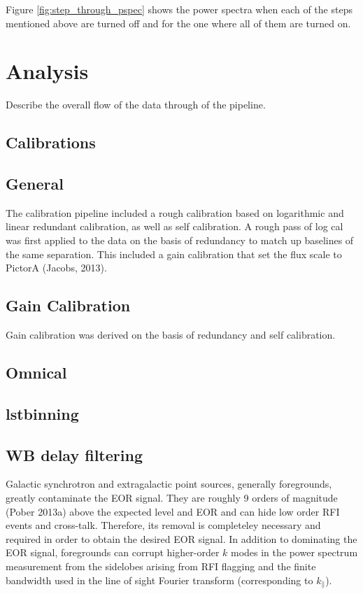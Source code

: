 \documentclass[twocolumn,numberedappendix]{emulateapj}
\begin{document}
Figure \ref{fig:step_through_pspec} shows the power spectra when each of the
steps mentioned above are turned off and for the one where all of them are
turned on.




\section{Analysis}
Describe the overall flow of the data through of the pipeline.
\subsection{Calibrations}
\subsection{General}
The calibration pipeline included a rough calibration based on logarithmic and
linear redundant calibration, as well as self calibration. A rough pass of log
cal was first applied to the data on the basis of redundancy to match up
baselines of the same separation. This included a gain calibration that set the
flux scale to PictorA (Jacobs, 2013).

\subsection{Gain Calibration}
Gain calibration was derived on the basis of redundancy and self calibration.

\subsection{Omnical}
%

\subsection{lstbinning}

\subsection{WB delay filtering}
Galactic synchrotron and extragalactic point sources, generally foregrounds,
greatly contaminate the EOR signal. They are roughly 9 orders of magnitude
(Pober 2013a) above the expected level and EOR and can hide low order RFI events
and cross-talk.  Therefore, its removal is completeley necessary and required in
order to obtain the desired EOR signal. In addition to dominating the EOR
signal, foregrounds can corrupt higher-order $k$ modes in the power spectrum
measurement from the sidelobes arising from RFI flagging and the finite
bandwidth used in the line of sight Fourier transform (corresponding to
$k_{\parallel}$).
\end{document}
